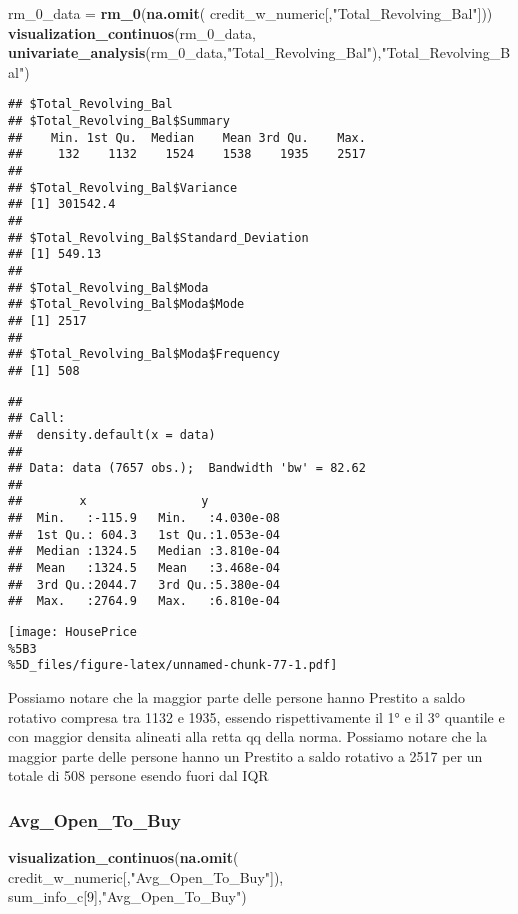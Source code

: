 \documentclass[
]{article}
\newenvironment{Shaded}{\begin{snugshade}}{\end{snugshade}}
\newcommand{\DecValTok}[1]{\textcolor[rgb]{0.00,0.00,0.81}{#1}}
\newcommand{\FunctionTok}[1]{\textcolor[rgb]{0.13,0.29,0.53}{\textbf{#1}}}
\newcommand{\NormalTok}[1]{#1}
\newcommand{\OtherTok}[1]{\textcolor[rgb]{0.56,0.35,0.01}{#1}}
\newcommand{\StringTok}[1]{\textcolor[rgb]{0.31,0.60,0.02}{#1}}
\begin{document}
\begin{Shaded}
\begin{Highlighting}[]
\NormalTok{rm\_0\_data }\OtherTok{=} \FunctionTok{rm\_0}\NormalTok{(}\FunctionTok{na.omit}\NormalTok{(}
\NormalTok{  credit\_w\_numeric[,}\StringTok{"Total\_Revolving\_Bal"}\NormalTok{]))}
\FunctionTok{visualization\_continuos}\NormalTok{(rm\_0\_data, }\FunctionTok{univariate\_analysis}\NormalTok{(rm\_0\_data,}\StringTok{"Total\_Revolving\_Bal"}\NormalTok{),}\StringTok{"Total\_Revolving\_Bal"}\NormalTok{)}
\end{Highlighting}
\end{Shaded}

\begin{verbatim}
## $Total_Revolving_Bal
## $Total_Revolving_Bal$Summary
##    Min. 1st Qu.  Median    Mean 3rd Qu.    Max. 
##     132    1132    1524    1538    1935    2517 
## 
## $Total_Revolving_Bal$Variance
## [1] 301542.4
## 
## $Total_Revolving_Bal$Standard_Deviation
## [1] 549.13
## 
## $Total_Revolving_Bal$Moda
## $Total_Revolving_Bal$Moda$Mode
## [1] 2517
## 
## $Total_Revolving_Bal$Moda$Frequency
## [1] 508
\end{verbatim}

\begin{verbatim}
## 
## Call:
##  density.default(x = data)
## 
## Data: data (7657 obs.);  Bandwidth 'bw' = 82.62
## 
##        x                y            
##  Min.   :-115.9   Min.   :4.030e-08  
##  1st Qu.: 604.3   1st Qu.:1.053e-04  
##  Median :1324.5   Median :3.810e-04  
##  Mean   :1324.5   Mean   :3.468e-04  
##  3rd Qu.:2044.7   3rd Qu.:5.380e-04  
##  Max.   :2764.9   Max.   :6.810e-04
\end{verbatim}

\texttt{[image: HousePrice\\\%5B3\\\%5D\_files/figure-latex/unnamed-chunk-77-1.pdf]}

Possiamo notare che la maggior parte delle persone hanno Prestito a
saldo rotativo compresa tra 1132 e 1935, essendo rispettivamente il 1° e
il 3° quantile e con maggior densita alineati alla retta qq della norma.
Possiamo notare che la maggior parte delle persone hanno un Prestito a
saldo rotativo a 2517 per un totale di 508 persone esendo fuori dal IQR

\subsubsection{Avg\_Open\_To\_Buy}\label{avg_open_to_buy}

\begin{Shaded}
\begin{Highlighting}[]
\FunctionTok{visualization\_continuos}\NormalTok{(}\FunctionTok{na.omit}\NormalTok{(}
\NormalTok{  credit\_w\_numeric[,}\StringTok{"Avg\_Open\_To\_Buy"}\NormalTok{]), sum\_info\_c[}\DecValTok{9}\NormalTok{],}\StringTok{"Avg\_Open\_To\_Buy"}\NormalTok{)}
\end{Highlighting}
\end{Shaded}
\end{document}
